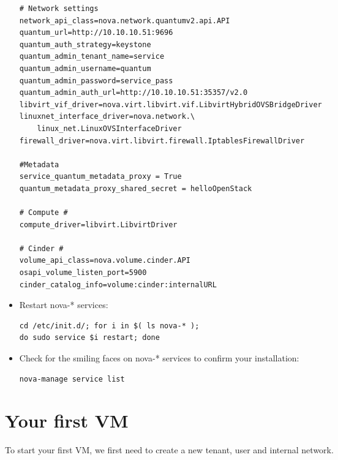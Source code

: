 \begin{itemize}
\begin{verbatim}
# Network settings
network_api_class=nova.network.quantumv2.api.API
quantum_url=http://10.10.10.51:9696
quantum_auth_strategy=keystone
quantum_admin_tenant_name=service
quantum_admin_username=quantum
quantum_admin_password=service_pass
quantum_admin_auth_url=http://10.10.10.51:35357/v2.0
libvirt_vif_driver=nova.virt.libvirt.vif.LibvirtHybridOVSBridgeDriver
linuxnet_interface_driver=nova.network.\
    linux_net.LinuxOVSInterfaceDriver
firewall_driver=nova.virt.libvirt.firewall.IptablesFirewallDriver

#Metadata
service_quantum_metadata_proxy = True
quantum_metadata_proxy_shared_secret = helloOpenStack 

# Compute #
compute_driver=libvirt.LibvirtDriver

# Cinder #
volume_api_class=nova.volume.cinder.API
osapi_volume_listen_port=5900
cinder_catalog_info=volume:cinder:internalURL
\end{verbatim}


\item Restart nova-* services:

\begin{verbatim}
cd /etc/init.d/; for i in $( ls nova-* ); 
do sudo service $i restart; done   
\end{verbatim}


\item Check for the smiling faces on nova-* services to confirm your installation:

\begin{verbatim}
nova-manage service list
\end{verbatim}


\end{itemize}

\chapter{Your first VM}
\label{yourfirstvm}

To start your first VM, we first need to create a new tenant, user and internal network.

